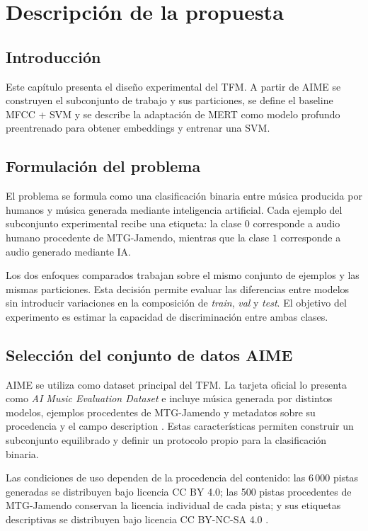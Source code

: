 \chapter{Descripción de la propuesta}\label{cap:propuesta}

\section{Introducción}

Este capítulo presenta el diseño experimental del TFM. A partir de AIME se construyen el subconjunto de trabajo y sus particiones, se define el baseline MFCC + SVM y se describe la adaptación de MERT como modelo profundo preentrenado para obtener embeddings y entrenar una SVM.

\section{Formulación del problema}

El problema se formula como una clasificación binaria entre música producida por humanos y música generada mediante inteligencia artificial. Cada ejemplo del subconjunto experimental recibe una etiqueta: la clase $0$ corresponde a audio humano procedente de MTG-Jamendo, mientras que la clase $1$ corresponde a audio generado mediante IA.

Los dos enfoques comparados trabajan sobre el mismo conjunto de ejemplos y las mismas particiones. Esta decisión permite evaluar las diferencias entre modelos sin introducir variaciones en la composición de \textit{train}, \textit{val} y \textit{test}. El objetivo del experimento es estimar la capacidad de discriminación entre ambas clases.

\section{Selección del conjunto de datos AIME}

AIME se utiliza como dataset principal del TFM. La tarjeta oficial lo presenta como \textit{AI Music Evaluation Dataset} e incluye música generada por distintos modelos, ejemplos procedentes de MTG-Jamendo y metadatos sobre su procedencia y el campo description \cite{discoethAIME}. Estas características permiten construir un subconjunto equilibrado y definir un protocolo propio para la clasificación binaria.

Las condiciones de uso dependen de la procedencia del contenido: las 6\,000 pistas generadas se distribuyen bajo licencia CC BY 4.0; las 500 pistas procedentes de MTG-Jamendo conservan la licencia individual de cada pista; y sus etiquetas descriptivas se distribuyen bajo licencia CC BY-NC-SA 4.0 \cite{discoethAIME}.

